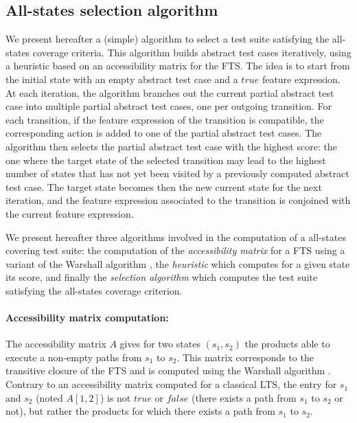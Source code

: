 \subsection{All-states selection algorithm}

\label{subsec:allstatesselection}

We present hereafter a (simple) algorithm to select a test suite satisfying the all-states coverage criteria. This algorithm builds abstract test cases iteratively, using a heuristic based on an accessibility matrix for the FTS. The idea is to start from the initial state with an empty abstract test case and a $true$ feature expression. At each iteration, the algorithm branches out the current partial abstract test case into multiple partial abstract test cases, one per outgoing transition. For each transition, if the feature expression of the transition is compatible, the corresponding action is added to one of the partial abstract test cases. The algorithm then selects the partial abstract test case with the highest score: \ie the one where the target state of the selected transition may lead to the highest number of states that has not yet been visited by a previously computed abstract test case. The target state becomes then the new current state for the next iteration, and the feature expression associated to the transition is conjoined with the current feature expression.

We present hereafter three algorithms involved in the computation of a all-states covering test suite: the computation of the \emph{accessibility matrix} for a FTS using a variant of the Warshall algorithm \cite{Rosen2011}, the \emph{heuristic} which computes for a given state its score, and finally the \emph{selection algorithm} which computes the test suite satisfying the all-states coverage criterion. 

\paragraph{Accessibility matrix computation:}

The accessibility matrix $A$ gives for two states $(s_1, s_2)$ the products able to execute a non-empty paths from $s_1$ to $s_2$. This matrix corresponds to the transitive closure of the \gls{FTS} and is computed using the Warshall algorithm \cite{Rosen2011}. 
Contrary to an accessibility matrix computed for a classical LTS, the entry for $s_1$ and $s_2$ (noted $A[1,2]$) is not $true$ or $false$ (\ie there exists a path from $s_1$ to $s_2$ or not), but rather the products for which there exists a path from $s_1$ to $s_2$.

